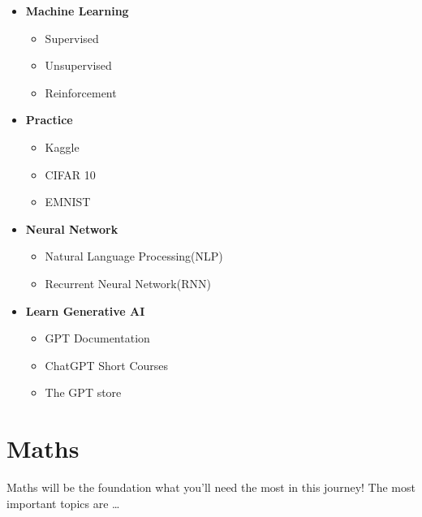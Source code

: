 \documentclass{book}
\begin{document}
\begin{itemize}
	\item \textbf{Machine Learning}
	      \begin{itemize}
		      \item Supervised
		      \item Unsupervised
		      \item Reinforcement
	      \end{itemize}
	\item \textbf{Practice}
	      \begin{itemize}
		      \item Kaggle
		      \item CIFAR 10
		      \item EMNIST
	      \end{itemize}
	\item \textbf{Neural Network}
	      \begin{itemize}
		      \item Natural Language Processing(NLP)
		      \item Recurrent Neural Network(RNN)
	      \end{itemize}
	\item \textbf{Learn Generative AI}
	      \begin{itemize}
		      \item GPT Documentation
		      \item ChatGPT Short Courses
		      \item The GPT store
	      \end{itemize}
\end{itemize}


\chapter{Maths}

Maths will be the foundation what you'll need the most in this journey!
The most important topics are \dots
\end{document}
